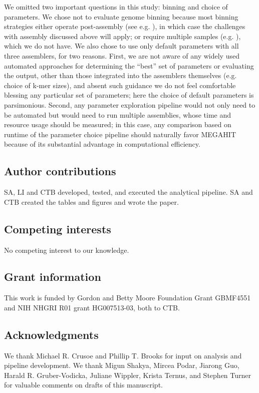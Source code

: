 \documentclass[11pt]{article}
\begin{document}
We omitted two important questions in this study: binning and choice
of parameters.  We chose not to evaluate genome binning because most
binning strategies either operate post-assembly (see
e.g. \cite{laczny2017busybee}), in which case the challenges with
assembly discussed above will apply; or require multiple samples
(e.g. \cite{Cleary2015}), which we do not have.  We also chose to use
only default parameters with all three assemblers, for two reasons.
First, we are not aware of any widely used automated approaches for
determining the ``best'' set of parameters or evaluating the output,
other than those integrated into the assemblers themselves
(e.g. choice of k-mer sizes), and absent such guidance we do not feel
comfortable blessing any particular set of parameters; here the choice
of default parameters is parsimonious.  Second, any parameter
exploration pipeline would not only need to be automated but would
need to run multiple assemblies, whose time and resource usage should
be measured; in this case, any comparison based on
runtime of the parameter choice pipeline should naturally favor MEGAHIT
because of its substantial advantage in computational efficiency.

\subsection*{Author contributions}

SA, LI and CTB developed, tested, and executed the analytical pipeline.
SA and CTB created the tables and figures and wrote the paper.

\subsection*{Competing interests}
No competing interest to our knowledge.

\subsection*{Grant information}
This work is funded by
Gordon and Betty Moore Foundation Grant GBMF4551 and
NIH NHGRI R01 grant HG007513-03, both to CTB.

\subsection*{Acknowledgments}
We thank Michael R. Crusoe and Phillip T. Brooks for input on analysis
and pipeline development.  We thank Migun Shakya, Mircea Podar, Jiarong Guo,
Harald R. Gruber-Vodicka, Juliane Wippler, Krista Ternus, and Stephen
Turner for valuable comments on drafts of this manuscript.
\end{document}
